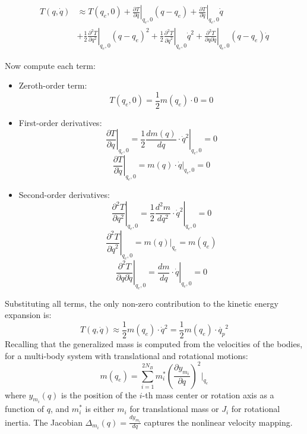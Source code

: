 \begin{align*}
T(q, \dot{q}) &\approx T(q_e, 0) + \left. \frac{\partial T}{\partial q} \right|_{q_e,0} (q - q_e) + \left. \frac{\partial T}{\partial \dot{q}} \right|_{q_e,0} \dot{q} \\
&+ \frac{1}{2} \left. \frac{\partial^2 T}{\partial q^2} \right|_{q_e,0} (q - q_e)^2 
+ \frac{1}{2} \left. \frac{\partial^2 T}{\partial \dot{q}^2} \right|_{q_e,0} \dot{q}^2 
+ \left. \frac{\partial^2 T}{\partial q \partial \dot{q}} \right|_{q_e,0} (q - q_e)\dot{q}
\end{align*}

Now compute each term:

\begin{itemize}
    \item Zeroth-order term:
    \[
    T(q_e, 0) = \frac{1}{2} m(q_e) \cdot 0 = 0
    \]
    \item First-order derivatives:
    \[ 
    \left. \frac{\partial T}{\partial q} \right|_{q_e,0} = \left. \frac{1}{2} \frac{d m(q)}{d q} \cdot \dot{q}^2 \right|_{q_e,0} = 0
    \]
    \[
    \left. \frac{\partial T}{\partial \dot{q}} \right|_{q_e,0} = \left. m(q) \cdot \dot{q} \right|_{q_e,0} = 0
    \]
    \item Second-order derivatives:
    \[
    \left. \frac{\partial^2 T}{\partial q^2} \right|_{q_e,0} = \left. \frac{1}{2} \frac{d^2 m}{d q^2} \cdot \dot{q}^2 \right|_{q_e,0} = 0
    \]
    \[
    \left. \frac{\partial^2 T}{\partial \dot{q}^2} \right|_{q_e,0} = \left. m(q) \right|_{q_e} = m(q_e)
    \]
    \[
    \left. \frac{\partial^2 T}{\partial q \partial \dot{q}} \right|_{q_e,0} = \left. \frac{d m}{d q} \cdot \dot{q} \right|_{q_e,0} = 0
    \]
\end{itemize}

Substituting all terms, the only non-zero contribution to the kinetic energy expansion is:
\[
T(q, \dot{q}) \approx \frac{1}{2} m(q_e) \cdot \dot{q}^2 = \frac{1}{2} m(q_e) \cdot \dot{q_p}^2
\]
Recalling that the generalized mass is computed from the velocities of the bodies, for a multi-body system with translational and rotational motions:
\[
m(q_e) = \sum_{i=1}^{2N_B} m_i^* \left( \frac{\partial y_{m_i}}{\partial q} \right)^2 \Bigg|_{q_e}
\]
where \( y_{m_i}(q) \) is the position of the \( i \)-th mass center or rotation axis as a function of \( q \), and \( m_i^* \) is either \( m_i \) for translational mass or \( J_i \) for rotational inertia. The Jacobian \( \Delta_{m_i}(q) = \frac{d y_{m_i}}{d q} \) captures the nonlinear velocity mapping.

